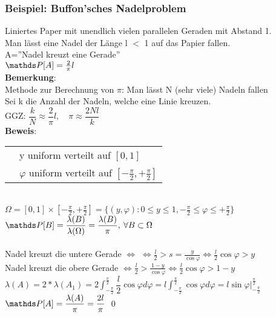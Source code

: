 \subsubsection{Beispiel: Buffon'sches Nadelproblem}
Liniertes Paper mit unendlich vielen parallelen Geraden mit Abstand 1.\smallskip\\
Man lässt eine Nadel der Länge l $<$ 1 auf das Papier fallen.\medskip\\
A=''Nadel kreuzt eine Gerade''\smallskip\\
$\PP[A] = \frac{2}{\pi}l$\smallskip\\
\textbf{Bemerkung}:\\
Methode zur Berechnung von $\pi$: Man lässt N (sehr viele) Nadeln fallen\\
Sei k die Anzahl der Nadeln, welche eine Linie kreuzen.\medskip\\
GGZ: $\dfrac{k}{N} \approx \dfrac{2}{\pi}l, \quad \pi \approx \dfrac{2Nl}{k}$\smallskip\\
\textbf{Beweis}:\\
\begin{tabular}{ll}
	\imgHere{ nadeln phi} & y uniform verteilt auf $[0,1]$\\
	& $\varphi$ uniform verteilt auf $[-\frac{\pi}{2},+\frac{\pi}{2}]$
\end{tabular}\smallskip\\
$\Omega = [0,1] \times [-\frac{\pi}{2},+\frac{\pi}{2}] = \{(y,\varphi):0\leq y \leq 1, -\frac{\pi}{2}\leq \varphi \leq + \frac{\pi}{2}\}$\smallskip\\
$\PP[B] = \dfrac{\lambda(B)}{\lambda(\Omega)}=\dfrac{\lambda(B)}{\pi},\: \forall B \subset \Omega$\smallskip\\
\smallskip\\
Nadel kreuzt die untere Gerade $\Leftrightarrow$ $\Leftrightarrow \frac{l}{2}>s=\frac{y}{\cos \varphi} \Leftrightarrow\frac{l}{2}\cos \varphi > y$\medskip\\
Nadel kreuzt die obere Gerade $\Leftrightarrow \frac{l}{2}>\frac{1-y}{\cos \varphi} \Leftrightarrow \frac{l}{2}\cos \varphi > 1-y$\medskip\\
$\lambda(A)=2*\lambda(A_1)=2 \displaystyle\int_{-\frac{\pi}{2}}^{\frac{\pi}{2}}\dfrac{l}{2}\cos \varphi d \varphi = l \displaystyle\int_{-\frac{\pi}{2}}^{\frac{\pi}{2}} \cos \varphi d \varphi = l \sin \varphi \big|_{-\frac{\pi}{2}}^{\frac{\pi}{2}}$\medskip\\
$\PP[A] = \dfrac{\lambda(A)}{\pi} = \dfrac{2l}{\pi}$ \qed\medskip\\
